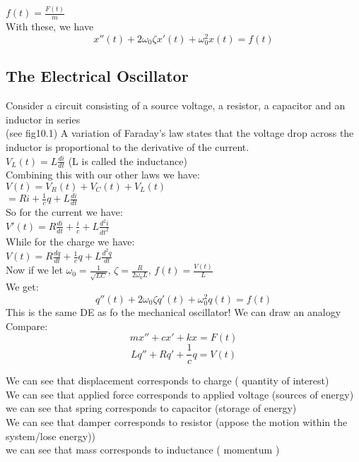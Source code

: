 \documentclass[12pt]{article}
\begin{document}
	$f(t) = \frac{F(t)}{m}$\\
	With these, we have
	$$x''(t) + 2\omega_0\zeta x'(t) + \omega_0^2x(t) = f(t)$$
	
	\subsection*{The Electrical Oscillator}
	Consider a circuit consisting of a source voltage, a resistor, a capacitor and an inductor in series\\
	(see fig10.1)
	A variation of Faraday's law states that the voltage drop across the inductor is proportional to the derivative of the current.\\
	$V_L(t) = L\frac{di}{dt}$ (L is called the inductance)\\
	Combining this with our other laws we have:\\
	$V(t) = V_R(t) + V_C(t) + V_L(t)$\\
	$= Ri + \frac{1}{c}q + L\frac{di}{dt}$\\
	
	So for the current we have:\\
	$V'(t) = R\frac{di}{dt} + \frac{i}{c} + L\frac{d^2i}{dt^2}$\\
	While for the charge we have:\\
	$V(t) = R\frac{dq}{dt} + \frac{1}{c}q + L\frac{d^2q}{dt}$\\
	
	Now if we let $\omega_0 = \frac{1}{\sqrt{LC}}$, $\zeta = \frac{R}{2\omega_0L}$, $f(t) = \frac{V(t)}{L}$\\
	We get:\\
	$$q''(t) + 2\omega_0\zeta q'(t) + \omega_0^2 q(t) = f(t)$$
	This is the same DE as fo the mechanical oscillator! We can draw an analogy\\
	
	Compare:\\
	$$mx'' + cx' + kx = F(t)$$
	$$Lq'' + Rq' + \frac{1}{c}q = V(t)$$
	
	We can see that displacement corresponds to charge ( quantity of interest)\\
	We can see that applied force corresponds to applied voltage (sources of energy)\\
	we can see that spring corresponds to capacitor (storage of energy)\\
	We can see that damper corresponds to resistor (appose the motion within the system/lose energy))\\
	we can see that mass corresponds to inductance ( momentum )\\
	
\end{document}
